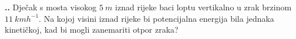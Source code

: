 
\noindent 
\textbf{
\thecjelina.\thezadatak.}
Dječak s mosta visokog $5\ m$ iznad rijeke baci loptu vertikalno u zrak brzinom $11\ kmh^{-1}$.
Na kojoj visini iznad rijeke bi potencijalna energija bila jednaka kinetičkoj, kad bi mogli
zanemariti otpor zraka?



